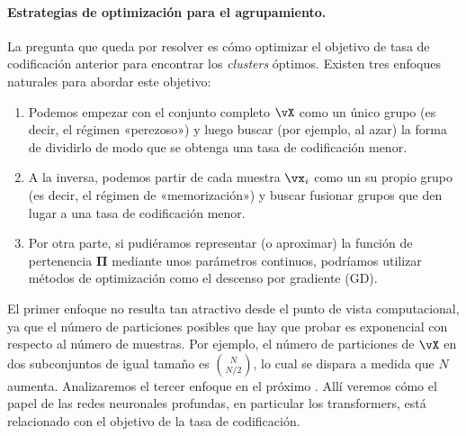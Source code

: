 \documentclass[../../book-main.tex]{subfiles}
\begin{document}
\paragraph{Estrategias de optimización para el agrupamiento.}
La pregunta que queda por resolver es cómo optimizar el objetivo de tasa de codificación anterior
para encontrar los \textit{clusters} óptimos. Existen tres enfoques naturales
para abordar este objetivo:
\begin{enumerate}
    \item Podemos empezar con el conjunto completo $\vX$ como un único grupo
        (es decir, el régimen «perezoso») y luego buscar (por ejemplo, al azar) la forma de
        dividirlo de modo que se obtenga una tasa de codificación menor. 
    \item A la inversa, podemos partir de cada muestra $\vx_i$ como un su propio grupo 
        (es decir, el régimen de «memorización»)  y buscar fusionar grupos
        que den lugar a una tasa de codificación menor.
    \item Por otra parte, si pudiéramos representar (o aproximar) la
        función de pertenencia $\boldsymbol{\Pi}$ mediante unos parámetros continuos,
        podríamos utilizar métodos de optimización como el descenso por gradiente (GD).
\end{enumerate}
El primer enfoque no resulta tan atractivo desde el punto de vista computacional, ya que el número
de particiones posibles que hay que probar es exponencial con respecto al
número de muestras. Por ejemplo, el número de particiones de $\vX$ en
dos subconjuntos de igual tamaño es $N \choose N/2$, lo cual se dispara a medida que $N$
aumenta. Analizaremos el tercer enfoque en el próximo
. Allí veremos cómo el papel de las
redes neuronales profundas, en particular los transformers, está relacionado con el
objetivo de la tasa de codificación.
\end{document}
